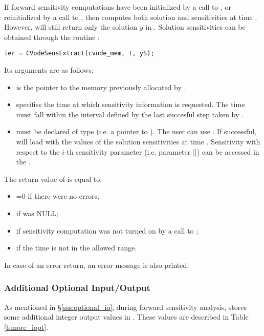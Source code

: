 If forward sensitivity computations have been initialized by a call to ,
or reinitialized by a call to , then {\cvodes} computes both solution
and sensitivities at time . However,  will still return only the solution
$y$ in . Solution sensitivities can be obtained through the routine
:
\begin{verbatim}
ier = CVodeSensExtract(cvode_mem, t, yS);
\end{verbatim}
Its arguments are as follows:
\begin{itemize}
\item {} is the pointer to the memory previously allocated
  by .
\item {} specifies the time at which sensitivity information is 
  requested. The time  must fall within the interval defined by the last 
  succesful step taken by {\cvodes}.
\item {} must be declared of type  (i.e. a pointer to 
  ). The user can use . 
  If successful,  will load  with the values of the
  solution sensitivities at time . Sensitivity with respect to the $i$-th
  sensitivity parameter (i.e. parameter \id{p[}$|$$|$\id{-1]}) can be accessed in
  the  .
\end{itemize}
The return value  of  is equal to: 
\begin{itemize}
\item {}=0 if there were no errors; 
\item {} if  was NULL;
\item {} if sensitivity computation was not turned on
      by a call to ;
\item {} if the time  is not in the allowed range.
\end{itemize}
In case of an error return, an error message is also printed.  

\subsubsection{Additional Optional Input/Output}\label{sss:more_optional_io}

As mentioned in \S\ref{sss:optional_io}, during forward sensitivity 
analysis, {\cvodes} stores some additional integer output values in .
These values are described in Table \ref{t:more_iopt}.

